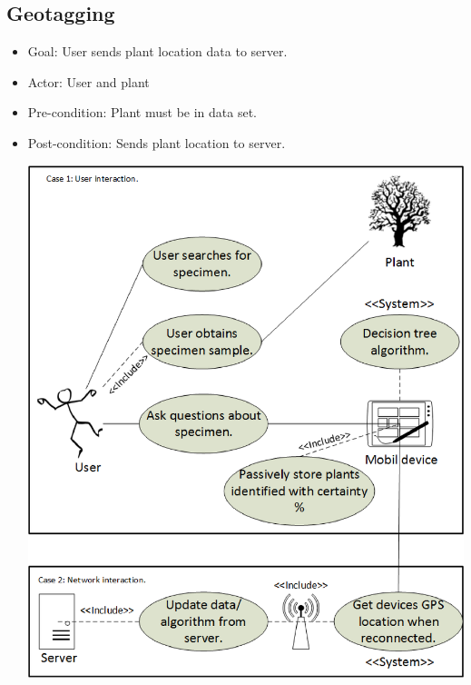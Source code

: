 \documentclass[a4paper]{article}
\begin{document}
\subsection{Geotagging}
\begin{itemize}
\item Goal: User sends plant location data to server.
\item Actor: User and plant
\item Pre-condition: Plant must be in data set.
\item Post-condition: Sends plant location to server.
\begin{center}\includegraphics[scale=.8]{Geotagging.eps}\end{center}
\end{itemize}
\pagebreak
\end{document}

